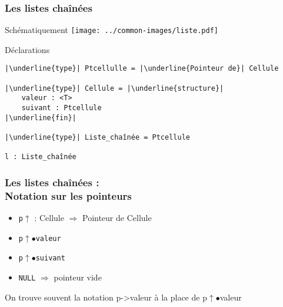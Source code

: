 \documentclass[table,handout,tikz,12pt,svgnames]{beamer}
\begin{document}
\begin{frame}[fragile=singleslide]
	\frametitle{Les listes chaînées}
	\begin{block}{Schématiquement}
			\vspace{0.3cm}
			{\texttt{[image: ../common-images/liste.pdf]}}
	\end{block}
	\begin{block}{Déclarations}
		\begin{verbatim}
|\underline{type}| Ptcellulle = |\underline{Pointeur de}| Cellule

|\underline{type}| Cellule = |\underline{structure}|
	valeur : <T>
	suivant : Ptcellule
|\underline{fin}|

|\underline{type}| Liste_chaînée = Ptcellule

l : Liste_chaînée
		\end{verbatim}
	\end{block}
\end{frame}


\begin{frame}[fragile=singleslide]
	\frametitle{Les listes chaînées :\\ Notation sur les pointeurs}
	\begin{block}{} %
		\begin{itemize}
			\item \texttt{p$\uparrow$} : Cellule  $\Rightarrow$ Pointeur de Cellule
			\item \texttt{p$\uparrow$$\bullet$valeur}
			\item \texttt{p$\uparrow$$\bullet$suivant}
			\item \texttt{NULL} $\Rightarrow$ pointeur vide
		\end{itemize}
	\end{block}
	\vspace{1cm}
	\begin{block}{On trouve souvent la notation p->valeur à la place de p$\uparrow$$\bullet$valeur} %
	\end{block}
\end{frame}
\end{document}
